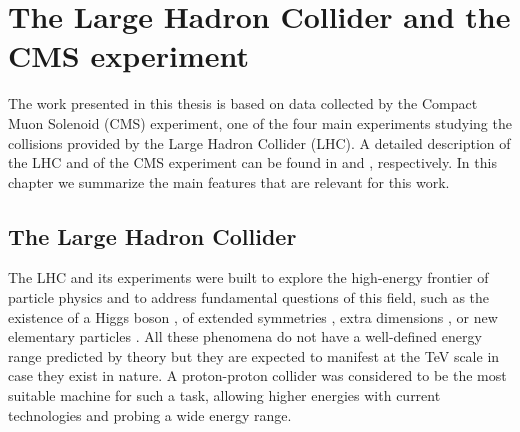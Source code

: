 \chapter{The Large Hadron Collider and the CMS experiment}
\label{sec:chap_2}

The work presented in this thesis is based on data collected by the Compact Muon Solenoid (CMS) experiment, 
one of the four main experiments studying the collisions 
provided by the Large Hadron Collider (LHC). A detailed description of the LHC and of the CMS 
experiment can be found in \cite{Evans:2006tq} and \cite{Chatrchyan:2008aa}, respectively.
In this chapter we summarize the main features that are relevant for this work.

\section{The Large Hadron Collider}

The LHC and its experiments were built to explore the high-energy frontier of particle physics and to address fundamental questions of this field, such as the existence of a Higgs boson \cite{Englert:1964et,Higgs:1964ia,Higgs:1964pj,Guralnik:1964eu,Higgs:1966ev,Kibble:1967sv}, of extended symmetries \cite{Martin:1997ns}, extra dimensions \cite{Antoniadis:1999bq}, or new elementary particles \cite{Beltran:2010ww,Randall:1999vf}. All these phenomena do not have a well-defined energy range predicted by theory but they are expected to manifest at the TeV scale in case they exist in nature. A proton-proton collider was considered to be the most suitable machine for such a task, allowing higher energies with current technologies and probing a wide energy range.%

